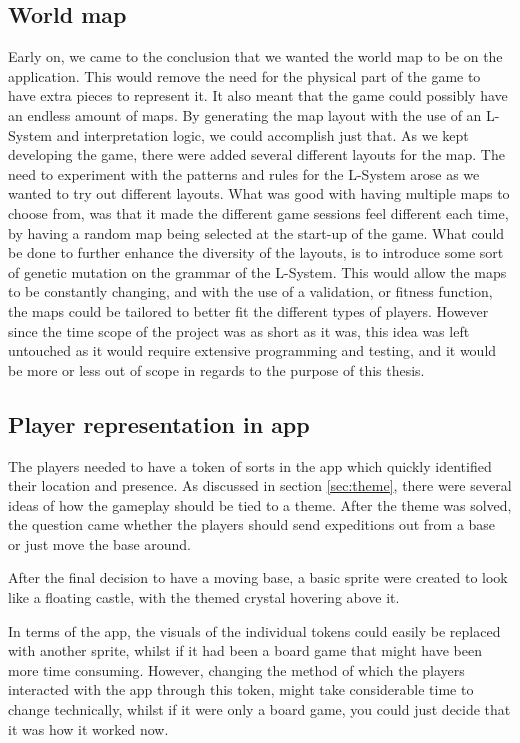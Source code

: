 \subsection{World map}
Early on, we came to the conclusion that we wanted the world map to be on the application. This would remove the need for the physical part of the game to have extra pieces to represent it. It also meant that the game could possibly have an endless amount of maps. By generating the map layout with the use of an L-System and interpretation logic, we could accomplish just that. As we kept developing the game, there were added several different layouts for the map. The need to experiment with the patterns and rules for the L-System arose as we wanted to try out different layouts. What was good with having multiple maps to choose from, was that it made the different game sessions feel different each time, by having a random map being selected at the start-up of the game. What could be done to further enhance the diversity of the layouts, is to introduce some sort of genetic mutation on the grammar of the L-System. This would allow the maps to be constantly changing, and with the use of a validation, or fitness function, the maps could be tailored to better fit the different types of players. However since the time scope of the project was as short as it was, this idea was left untouched as it would require extensive programming and testing, and it would be more or less out of scope in regards to the purpose of this thesis.

\subsection{Player representation in app}
The players needed to have a token of sorts in the app which quickly identified their location and presence.
As discussed in section \ref{sec:theme}, there were several ideas of how the gameplay should be tied to a theme. After the theme was solved, the question came whether the players should send expeditions out from a base or just move the base around.

After the final decision to have a moving base, a basic sprite were created to look like a floating castle, with the themed crystal hovering above it.

In terms of the app, the visuals of the individual tokens could easily be replaced with another sprite, whilst if it had been a board game that might have been more time consuming.
However, changing the method of which the players interacted with the app through this token, might take considerable time to change technically, whilst if it were only a board game, you could just decide that it was how it worked now.

